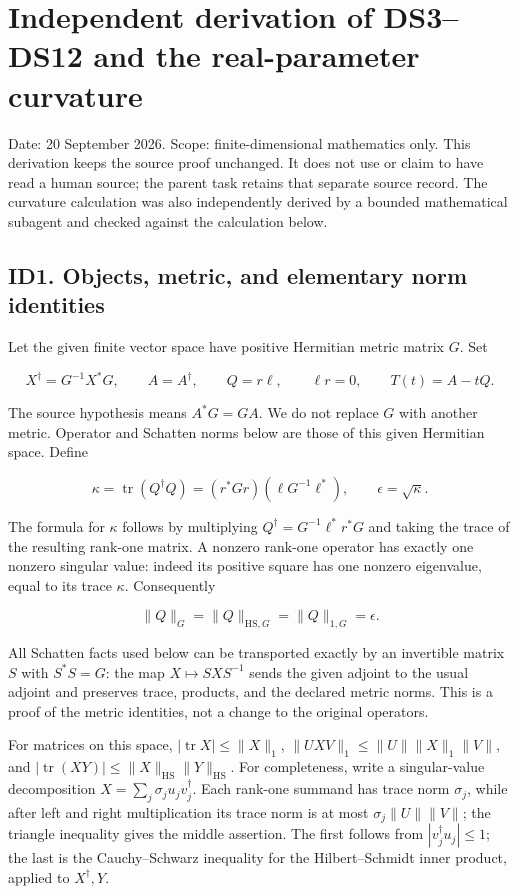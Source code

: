 \documentclass[11pt]{article}
\begin{document}
\section{Independent derivation of DS3--DS12 and the real-parameter curvature}\label{independent-derivation-of-ds3ds12-and-the-real-parameter-curvature}

Date: 20 September 2026. Scope: finite-dimensional mathematics only. This derivation keeps the source proof unchanged. It does not use or claim to have read a human source; the parent task retains that separate source record. The curvature calculation was also independently derived by a bounded mathematical subagent and checked against the calculation below.

\subsection{ID1. Objects, metric, and elementary norm identities}\label{id1.-objects-metric-and-elementary-norm-identities}

Let the given finite vector space have positive Hermitian metric matrix \(G\). Set

\[
X^\dagger=G^{-1}X^*G,\qquad
A=A^\dagger,\qquad Q=r\ell,\qquad \ell r=0,\qquad T(t)=A-tQ.
\]

The source hypothesis means \(A^*G=GA\). We do not replace \(G\) with another metric. Operator and Schatten norms below are those of this given Hermitian space. Define

\[
\kappa=\operatorname{tr}(Q^\dagger Q)
=(r^*Gr)(\ell G^{-1}\ell^*),\qquad \epsilon=\sqrt\kappa.
\]

The formula for \(\kappa\) follows by multiplying \(Q^\dagger=G^{-1}\ell^*r^*G\) and taking the trace of the resulting rank-one matrix. A nonzero rank-one operator has exactly one nonzero singular value: indeed its positive square has one nonzero eigenvalue, equal to its trace \(\kappa\). Consequently

\[
\|Q\|_G=\|Q\|_{\mathrm{HS},G}=\|Q\|_{1,G}=\epsilon.
\]

All Schatten facts used below can be transported exactly by an invertible matrix \(S\) with \(S^*S=G\): the map \(X\mapsto SXS^{-1}\) sends the given adjoint to the usual adjoint and preserves trace, products, and the declared metric norms. This is a proof of the metric identities, not a change to the original operators.

For matrices on this space, \(|\operatorname{tr}X|\le\|X\|_1\), \(\|UXV\|_1\le\|U\|\|X\|_1\|V\|\), and \(|\operatorname{tr}(XY)|\le\|X\|_{\mathrm{HS}}\|Y\|_{\mathrm{HS}}\). For completeness, write a singular-value decomposition \(X=\sum_j\sigma_j u_jv_j^\dagger\). Each rank-one summand has trace norm \(\sigma_j\), while after left and right multiplication its trace norm is at most \(\sigma_j\|U\|\|V\|\); the triangle inequality gives the middle assertion. The first follows from \(|v_j^\dagger u_j|\le1\); the last is the Cauchy--Schwarz inequality for the Hilbert--Schmidt inner product, applied to \(X^\dagger,Y\).
\end{document}
